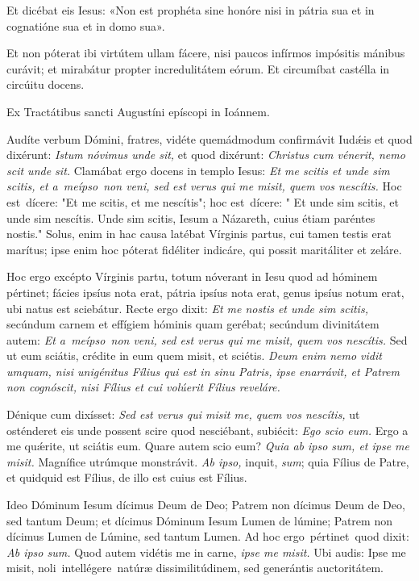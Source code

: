 {\noindent Et dicébat eis Iesus: «Non est prophéta sine honóre nisi in pátria sua et in cognatióne sua et in domo sua».

\noindent Et non póterat ibi virtútem ullam fácere, nisi paucos infírmos impósitis mánibus curávit; et mirabátur propter incredulitátem eórum. Et circumíbat castélla in circúitu docens.


\noindent Ex Tractátibus sancti Augustíni epíscopi in Ioánnem.

\noindent Audíte verbum Dómini, fratres, vidéte quemádmodum confirmávit Iudǽis et quod dixérunt: \textit{Istum nóvimus unde sit,} et quod dixérunt: \textit{Christus cum vénerit, nemo scit unde sit.} Clamábat ergo docens in templo Iesus: \textit{Et me scitis et unde sim scitis, et a meípso non veni, sed est verus qui me misit, quem vos nescítis.} Hoc est dícere: "Et me scitis, et me nescítis"; hoc est dícere: " Et unde sim scitis, et unde sim nescítis. Unde sim scitis, Iesum a Názareth, cuius étiam paréntes nostis." Solus, enim in hac causa latébat Vírginis partus, cui tamen testis erat marítus; ipse enim hoc póterat fidéliter indicáre, qui possit maritáliter et zeláre.
	
\noindent Hoc ergo excépto Vírginis partu, totum nóverant in Iesu quod ad hóminem pértinet; fácies ipsíus nota erat, pátria ipsíus nota erat, genus ipsíus notum erat, ubi natus est sciebátur. Recte ergo dixit: \textit{Et me nostis et unde sim scitis,} secúndum carnem et effígiem hóminis quam gerébat; secúndum divinitátem autem: \textit{Et a meípso non veni, sed est verus qui me misit, quem vos nescítis.} Sed ut eum sciátis, crédite in eum quem misit, et sciétis. \textit{Deum enim nemo vidit umquam, nisi unigénitus Fílius qui est in sinu Patris, ipse enarrávit, et Patrem non cognóscit, nisi Fílius et cui volúerit Fílius reveláre.}
 
\noindent Dénique cum dixísset: \textit{Sed est verus qui misit me, quem vos nescítis,} ut osténderet eis unde possent scire quod nesciébant, subiécit: \textit{Ego scio eum.} Ergo a me quǽrite, ut sciátis eum. Quare autem scio eum? \textit{Quia ab ipso sum, et ipse me misit.} Magnífice utrúmque monstrávit. \textit{Ab ipso,} inquit, \textit{sum}; quia Fílius de Patre, et quidquid est Fílius, de illo est cuius est Fílius.
	
\noindent Ideo Dóminum Iesum dícimus Deum de Deo; Patrem non dícimus Deum de Deo, sed tantum Deum; et dícimus Dóminum Iesum Lumen de lúmine; Patrem non dícimus Lumen de Lúmine, sed tantum Lumen. Ad hoc ergo pértinet quod dixit: \textit{Ab ipso sum.} Quod autem vidétis me in carne, \textit{ipse me misit.} Ubi audis: Ipse me misit, noli intellégere natúræ dissimilitúdinem, sed generántis auctoritátem.

\vfill
\pagebreak
}
